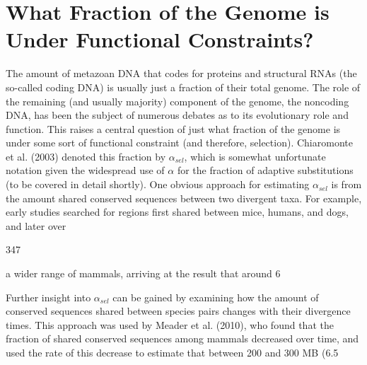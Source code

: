 \documentclass{article}
\begin{document}
\section{What Fraction of the Genome is Under Functional Constraints?}
The amount of metazoan DNA that codes for proteins and structural RNAs (the so-called coding DNA) is usually just a fraction of their total genome. The role of the remaining (and usually majority) component of the genome, the noncoding DNA, has been the subject of numerous debates as to its evolutionary role and function. This raises a central question of just what fraction of the genome is under some sort of functional constraint (and therefore, selection). Chiaromonte et al. (2003) denoted this fraction by  $ \alpha_{sel} $, which is somewhat unfortunate notation given the widespread use of  $ \alpha $ for the fraction of adaptive substitutions (to be covered in detail shortly). One obvious approach for estimating  $ \alpha_{sel} $ is from the amount shared conserved sequences between two divergent taxa. For example, early studies searched for regions first shared between mice, humans, and dogs, and later over

347

a wider range of mammals, arriving at the result that around 6%

Further insight into  $ \alpha_{sel} $ can be gained by examining how the amount of conserved sequences shared between species pairs changes with their divergence times. This approach was used by Meader et al. (2010), who found that the fraction of shared conserved sequences among mammals decreased over time, and used the rate of this decrease to estimate that between 200 and 300 MB (6.5%
\end{document}
